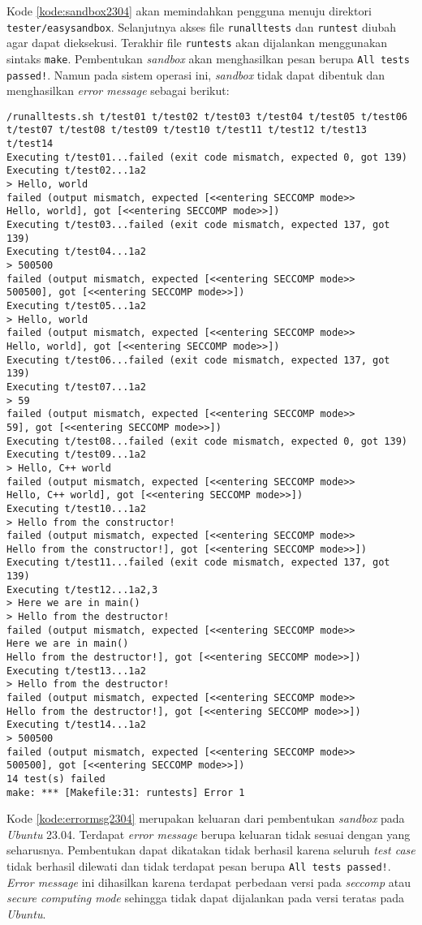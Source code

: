 Kode \ref{kode:sandbox2304} akan memindahkan pengguna menuju direktori \texttt{tester/easysandbox}. Selanjutnya akses file \texttt{runalltests} dan \texttt{runtest} diubah agar dapat dieksekusi. Terakhir file \texttt{runtests} akan dijalankan menggunakan sintaks \texttt{make}. Pembentukan \textit{sandbox} akan menghasilkan pesan berupa \texttt{All tests passed!}. Namun pada sistem operasi ini, \textit{sandbox} tidak dapat dibentuk dan menghasilkan \textit{error message} sebagai berikut:
\begin{lstlisting}[caption=\textit{Error message} pembangunan \textit{sandbox} pada \textit{Ubuntu} 23.04, label=kode:errormsg2304]
/runalltests.sh t/test01 t/test02 t/test03 t/test04 t/test05 t/test06 t/test07 t/test08 t/test09 t/test10 t/test11 t/test12 t/test13 t/test14
Executing t/test01...failed (exit code mismatch, expected 0, got 139)
Executing t/test02...1a2
> Hello, world
failed (output mismatch, expected [<<entering SECCOMP mode>>
Hello, world], got [<<entering SECCOMP mode>>])
Executing t/test03...failed (exit code mismatch, expected 137, got 139)
Executing t/test04...1a2
> 500500
failed (output mismatch, expected [<<entering SECCOMP mode>>
500500], got [<<entering SECCOMP mode>>])
Executing t/test05...1a2
> Hello, world
failed (output mismatch, expected [<<entering SECCOMP mode>>
Hello, world], got [<<entering SECCOMP mode>>])
Executing t/test06...failed (exit code mismatch, expected 137, got 139)
Executing t/test07...1a2
> 59
failed (output mismatch, expected [<<entering SECCOMP mode>>
59], got [<<entering SECCOMP mode>>])
Executing t/test08...failed (exit code mismatch, expected 0, got 139)
Executing t/test09...1a2
> Hello, C++ world
failed (output mismatch, expected [<<entering SECCOMP mode>>
Hello, C++ world], got [<<entering SECCOMP mode>>])
Executing t/test10...1a2
> Hello from the constructor!
failed (output mismatch, expected [<<entering SECCOMP mode>>
Hello from the constructor!], got [<<entering SECCOMP mode>>])
Executing t/test11...failed (exit code mismatch, expected 137, got 139)
Executing t/test12...1a2,3
> Here we are in main()
> Hello from the destructor!
failed (output mismatch, expected [<<entering SECCOMP mode>>
Here we are in main()
Hello from the destructor!], got [<<entering SECCOMP mode>>])
Executing t/test13...1a2
> Hello from the destructor!
failed (output mismatch, expected [<<entering SECCOMP mode>>
Hello from the destructor!], got [<<entering SECCOMP mode>>])
Executing t/test14...1a2
> 500500
failed (output mismatch, expected [<<entering SECCOMP mode>>
500500], got [<<entering SECCOMP mode>>])
14 test(s) failed
make: *** [Makefile:31: runtests] Error 1
\end{lstlisting}
Kode \ref{kode:errormsg2304} merupakan keluaran dari pembentukan \textit{sandbox} pada \textit{Ubuntu} 23.04. Terdapat \textit{error message} berupa keluaran tidak sesuai dengan yang seharusnya. Pembentukan dapat dikatakan tidak berhasil karena seluruh \textit{test case} tidak berhasil dilewati dan tidak terdapat pesan berupa \texttt{All tests passed!}. \textit{Error message} ini dihasilkan karena terdapat perbedaan versi pada \textit{seccomp} atau \textit{secure computing mode} sehingga tidak dapat dijalankan pada versi teratas pada \textit{Ubuntu}.

